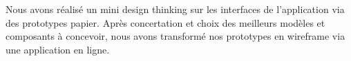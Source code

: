 \documentclass[t, 12pt, usenames,dvipsnames]{article}
\begin{document}
                \newpage
                
                \noindent Nous avons réalisé un mini design thinking sur les interfaces de l'application via des prototypes papier. Après concertation et choix des meilleurs modèles et composants à concevoir, nous avons transformé nos prototypes en wireframe via une application en ligne.
                
                \begin{center}
                    
                    \begin{figure}[h]       
                        \hfill                        {}

\end{figure}
\end{center}
\end{document}
